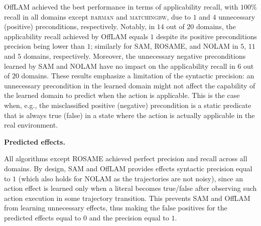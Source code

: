 \documentclass[letterpaper]{article} %
\newcommand{\nolam}{NOLAM\xspace}
\newcommand{\offlam}{OffLAM\xspace}
\newcommand{\rosame}{ROSAME\xspace}
\newcommand{\samshort}{SAM\xspace}
\newcommand{\miniparagraph}[1]{\textbf{#1.}}
\newif\ifaddcomments
\newcommand{\leo}[1]{\ifaddcomments{\textcolor{pink}{[Leonardo: #1]}}\fi}
\begin{document}
\offlam achieved the best performance in terms of applicability recall, with $100\%$ recall in all domains except \textsc{barman} and \textsc{matchingbw}, due to $1$ and $4$ unnecessary (positive) preconditions, respectively. 
%
Notably, in $14$ out of $20$ domains, the applicability recall achieved by \offlam equals $1$ despite its positive preconditions precision being lower than $1$; similarly for \samshort, \rosame, and \nolam in $5$, $11$ and $5$ domains, respectively. 
Moreover, the unnecessary negative preconditions learned by \samshort and \nolam have no impact on the applicability recall in $6$ out of $20$ domains. 
These results emphasize a limitation of the syntactic precision: an unnecessary precondition in the learned domain might not affect the capability of the learned domain to predict when the action is applicable. 
This is the case when, e.g., the misclassified positive (negative) precondition is a static predicate that is always true (false) in a state where the action is actually applicable in the real environment.


\miniparagraph{Predicted effects} 
%

%
All algorithms except \rosame achieved perfect precision and recall across all domains. 
By design, \samshort and \offlam provides effects syntactic precision equal to $1$ (which also holds for \nolam as the trajectories are not noisy), since an action effect is learned only when a literal becomes true/false after observing such action execution in some trajectory transition. This prevents \samshort and \offlam from learning unnecessary effects, thus making the false positives for the predicted effects equal to $0$ and the precision equal to $1$. 
\end{document}
